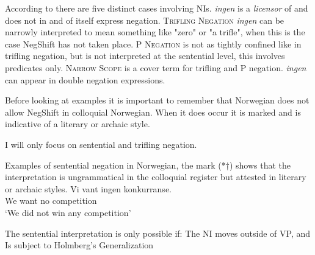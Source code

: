\documentclass[12pt, letterpaper]{article}
\begin{document}
\ex According to \citeauthor{svenoniusStrainsNegationNorwegian2002} there are five distinct cases involving NIs.
	\ea \emph{ingen} is a \emph{licensor} of and does not in and of itself express negation.
	\ex \textsc{Trifling Negation} \emph{ingen} can be narrowly interpreted to mean something like "zero" or "a trifle", when this is the case NegShift has not taken place. 
	\ex \textsc{P Negation} is not as tightly confined like in trifling negation, but is not interpreted at the sentential level, this involves predicates only. 
	\ex \textsc{Narrow Scope} is a cover term for trifling and P negation. 
	\ex \emph{ingen} can appear in double negation expressions.
	\z 

\ex Before looking at examples it is important to remember that Norwegian does not allow NegShift in colloquial Norwegian. 
	\ea When it does occur it is marked and is indicative of a literary or archaic style. 
	\z 

\ex I will only focus on sentential and trifling negation. 

\ex Examples of sentential negation in Norwegian, the mark (*†) shows that the interpretation is ungrammatical in the colloquial register but attested in literary or archaic styles.
	\ea 
	\gll Vi vant ingen konkurranse.\\
	We want no competition\\
	\trans `We did not win any competition'
	\z  

\ex The sentential interpretation is only possible if:
	\ea The NI moves outside of VP, and
	\ex Is subject to Holmberg's Generalization
	\z 

\end{document}
